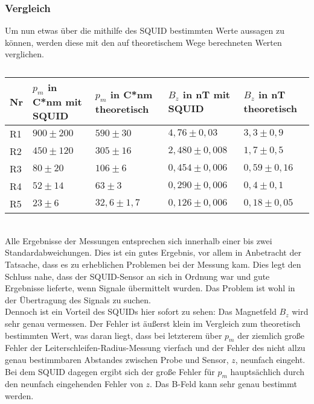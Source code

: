 \subsubsection{Vergleich}
Um nun etwas über die mithilfe des SQUID bestimmten Werte aussagen zu können, werden diese mit den auf theoretischem Wege berechneten Werten verglichen.
\begin{table}[htbp]
\caption{}
\begin{center}
\begin{tabular}{|l|p{3.5cm}|p{3.5cm}|p{3.5cm}|p{3.5cm}|}
\hline
Nr & $p_{m}$ in C*nm mit SQUID & $p_{m}$ in C*nm theoretisch & $B_{z}$ in nT mit SQUID & $B_{z}$ in nT theoretisch \\ \hline
R1 & $900\pm200$ & $590\pm30$ & $4,76\pm0,03$ & $3,3\pm0,9$ \\ 
R2 & $450\pm120$ & $305\pm16$ & $2,480\pm0,008$ & $1,7\pm0,5$ \\ 
R3 & $80\pm20$ & $106\pm6$ & $0,454\pm0,006$ & $0,59\pm0,16$ \\ 
R4 & $52\pm14$ & $63\pm3$ & $0,290\pm0,006$ & $0,4\pm0,1$ \\ 
R5 & $23\pm6$ & $32,6\pm1,7$ & $0,126\pm0,006$ & $0,18\pm0,05$ \\ \hline
\end{tabular}
\end{center}
\label{}
\end{table}
~\\
Alle Ergebnisse der Messungen entsprechen sich innerhalb einer bis zwei Standardabweichungen. Dies ist ein gutes Ergebnis, vor allem in Anbetracht der Tatsache, dass es zu erheblichen Problemen bei der Messung kam. Dies legt den Schluss nahe, dass der SQUID-Sensor an sich in Ordnung war und gute Ergebnisse lieferte, wenn Signale übermittelt wurden. Das Problem ist wohl in der Übertragung des Signals zu suchen.\\
Dennoch ist ein Vorteil des SQUIDs hier sofort zu sehen: Das Magnetfeld $B_{z}$ wird sehr genau vermessen. Der Fehler ist äußerst klein im Vergleich zum theoretisch bestimmten Wert, was daran liegt, dass bei letzterem über $p_{m}$ der ziemlich große Fehler der Leiterschleifen-Radius-Messung vierfach und der Fehler des nicht allzu genau bestimmbaren Abstandes zwischen Probe und Sensor, $z$, neunfach eingeht. \\
Bei dem SQUID dagegen ergibt sich der große Fehler für $p_{m}$ hauptsächlich durch den neunfach eingehenden Fehler von $z$. Das B-Feld kann sehr genau bestimmt werden.
